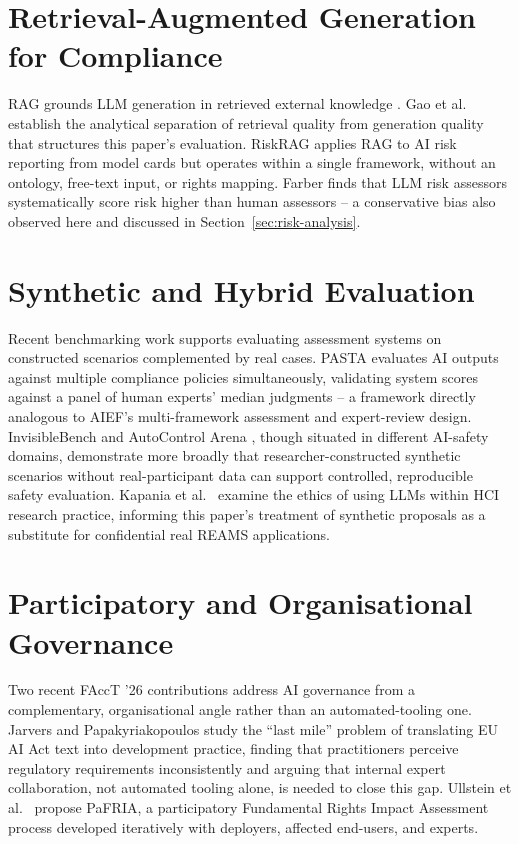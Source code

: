 \documentclass[a4paper,oneside,12pt]{book}
\numberwithin{equation}{chapter}
\begin{document}
\section{Retrieval-Augmented Generation for Compliance}

RAG grounds LLM generation in retrieved external knowledge \cite{lewis2020rag}. Gao et al.\ \cite{gao2023rag} establish the analytical separation of retrieval quality from generation quality that structures this paper's evaluation. RiskRAG \cite{riskrag2025} applies RAG to AI risk reporting from model cards but operates within a single framework, without an ontology, free-text input, or rights mapping. Farber \cite{farber2025} finds that LLM risk assessors systematically score risk higher than human assessors -- a conservative bias also observed here and discussed in Section~\ref{sec:risk-analysis}.

\section{Synthetic and Hybrid Evaluation}

Recent benchmarking work supports evaluating assessment systems on constructed scenarios complemented by real cases. PASTA \cite{pasta2026} evaluates AI outputs against multiple compliance policies simultaneously, validating system scores against a panel of human experts' median judgments -- a framework directly analogous to AIEF's multi-framework assessment and expert-review design. InvisibleBench \cite{invisiblebench2025} and AutoControl Arena \cite{autocontrolarena2025}, though situated in different AI-safety domains, demonstrate more broadly that researcher-constructed synthetic scenarios without real-participant data can support controlled, reproducible safety evaluation. Kapania et al.\ \cite{kapania2024} examine the ethics of using LLMs within HCI research practice, informing this paper's treatment of synthetic proposals as a substitute for confidential real REAMS applications.

\section{Participatory and Organisational Governance}

Two recent FAccT '26 contributions address AI governance from a complementary, organisational angle rather than an automated-tooling one. Jarvers and Papakyriakopoulos \cite{jarvers2026engaged} study the ``last mile'' problem of translating EU AI Act text into development practice, finding that practitioners perceive regulatory requirements inconsistently and arguing that internal expert collaboration, not automated tooling alone, is needed to close this gap. Ullstein et al.\ \cite{ullstein2026pafria} propose PaFRIA, a participatory Fundamental Rights Impact Assessment process developed iteratively with deployers, affected end-users, and experts.
\end{document}

